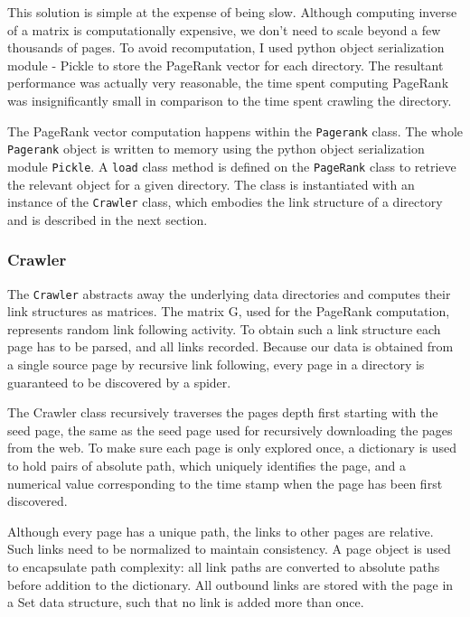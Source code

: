\documentclass[11pt,twoside,notitlepage]{report}
\begin{document}
This solution is simple at the expense of being slow. Although computing
inverse of a matrix is computationally expensive, we don't need to scale beyond
a few thousands of pages.  To avoid recomputation, I used python object
serialization module - Pickle to store the PageRank vector for each directory.
The resultant performance was actually very reasonable, the time spent
computing PageRank was insignificantly small in comparison to the time spent
crawling the directory.

The PageRank vector computation happens within the \texttt{Pagerank} class. The
whole \texttt{Pagerank} object is written to memory using the python object
serialization module \texttt{Pickle}. A \texttt{load} class method is defined
on the \texttt{PageRank} class to retrieve the relevant object for a given
directory. The class is instantiated with an instance of the \texttt{Crawler}
class, which embodies the link structure of a directory and is described in the
next section.

\subsubsection*{Crawler} 

The \texttt{Crawler} abstracts away the underlying data directories and
computes their link structures as matrices.  The matrix G, used for the
PageRank computation, represents random link following activity.  To obtain
such a link structure each page has to be parsed, and all links recorded.
Because our data is obtained from a single source page by recursive link
following, every page in a directory is guaranteed to be discovered by a
spider.

The Crawler class recursively traverses the pages depth first starting with the
seed page, the same as the seed page used for recursively downloading the pages
from the web. To make sure each page is only explored once, a dictionary is
used to hold pairs of absolute path, which uniquely identifies the page, and a
numerical value corresponding to the time stamp when the page has been first
discovered.

Although every page has a unique path, the links to other pages are relative.
Such links need to be normalized to maintain consistency.  A page object is
used to encapsulate path complexity: all link paths are converted to absolute
paths before addition to the dictionary.  All outbound links are stored with
the page in a Set data structure, such that no link is added more than once. 
\end{document}
